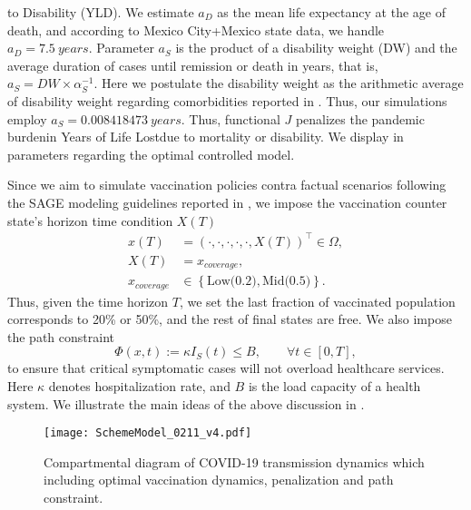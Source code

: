 to Disability (YLD). We estimate $a_D$ as the mean life expectancy at the age of
death, and according to Mexico City+Mexico state data, we handle
$a_D = \SI{7.5}{years}$.
Parameter $a_S$ is the product of a disability weight (DW) and the
average duration of cases until remission or death in years, that is,
$
a_S = DW \times \alpha_S^{-1}
$.
Here we postulate the disability weight as the arithmetic average of
disability weight regarding comorbidities reported in \cite{Jo2020}. Thus, our
simulations employ $a_S= \SI{0.008418473}{years}$.
%
Thus, functional $J$ penalizes the pandemic burden\textemdash in Years
of Life Lost\textemdash due to mortality or disability. We display in
 parameters regarding the
optimal controlled model.

Since we aim to simulate vaccination policies contra factual scenarios
following the SAGE modeling guidelines reported in \cite{sage2020},
we impose the vaccination counter state's horizon time condition
$X(T)$
\begin{equation}
    \label{eqn:coverage_constrain}
    \begin{aligned}
        x(T) &=
        (\cdot, \cdot, \cdot, \cdot, \cdot, X(T))^{\top}
        \in \Omega,
        \\
        X(T)
        &= x_{cover age},
        \\
        x_{coverage}
        & \in
        \left \{
        \text{Low(0.2)},\text{Mid(0.5)}
        \right \} .
    \end{aligned}
\end{equation}
Thus, given the time horizon $T$, we set the last fraction of
vaccinated population corresponds to 20\% or 50\%, and the rest of
final states are free. We also impose the path constraint
\begin{equation}
    \label{eqn:path_constrain}
    \Phi(x,t):= \kappa I_S(t) \leq B,
    \qquad \forall t \in [0, T],
\end{equation}
to ensure that critical symptomatic cases
will not overload healthcare services. Here $\kappa$
denotes hospitalization rate, and $B$ is the load capacity of a
health system. We illustrate the main ideas of the above discussion
in .
\begin{figure*}[tbh]
    \centering
    \texttt{[image: SchemeModel\_0211\_v4.pdf]}
    \caption{Compartmental diagram of COVID-19 transmission dynamics
    which
        including optimal vaccination dynamics, penalization and path
        constraint.}
    \label{Fig:SchemeModel_opt}
\end{figure*}

